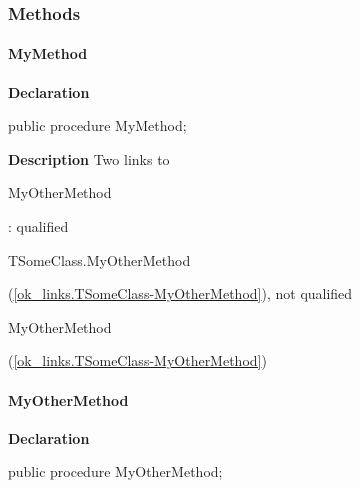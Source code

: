 \documentclass{report}
\begin{document}
\subsubsection*{\large{\textbf{Methods}}\normalsize\hspace{1ex}\hfill}
\paragraph*{MyMethod}\hspace*{\fill}

\begin{list}{}{
\setlength{\itemindent}{0cm}
\setlength{\listparindent}{0cm}
\setlength{\leftmargin}{\evensidemargin}
\addtolength{\leftmargin}{\tmplength}
\settowidth{\labelsep}{X}
\addtolength{\leftmargin}{\labelsep}
\setlength{\labelwidth}{\tmplength}
}
\begin{flushleft}
\item[\textbf{Declaration}\hfill]
\begin{ttfamily}
public procedure MyMethod;\end{ttfamily}


\end{flushleft}
\par
\item[\textbf{Description}]
Two links to \begin{ttfamily}MyOtherMethod\end{ttfamily} : qualified \begin{ttfamily}TSomeClass.MyOtherMethod\end{ttfamily}(\ref{ok_links.TSomeClass-MyOtherMethod}), not qualified \begin{ttfamily}MyOtherMethod\end{ttfamily}(\ref{ok_links.TSomeClass-MyOtherMethod})

\end{list}
\paragraph*{MyOtherMethod}\hspace*{\fill}

\begin{list}{}{
\setlength{\itemindent}{0cm}
\setlength{\listparindent}{0cm}
\setlength{\leftmargin}{\evensidemargin}
\addtolength{\leftmargin}{\tmplength}
\settowidth{\labelsep}{X}
\addtolength{\leftmargin}{\labelsep}
\setlength{\labelwidth}{\tmplength}
}
\begin{flushleft}
\item[\textbf{Declaration}\hfill]
\begin{ttfamily}
public procedure MyOtherMethod;\end{ttfamily}


\end{flushleft}
\end{list}
\end{document}
